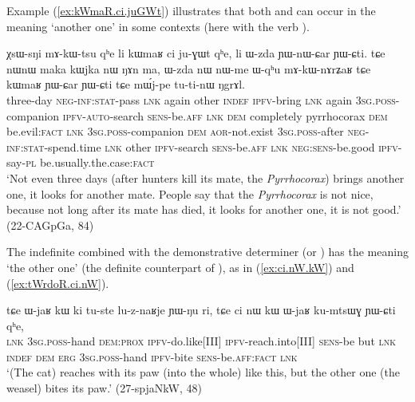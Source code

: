 Example (\ref{ex:kWmaR.ci.juGWt}) illustrates that both  and  can occur in the meaning `another one' in some contexts (here with the verb ).

 \begin{exe}
\ex \label{ex:kWmaR.ci.juGWt}
\gll  χsɯ-sŋi mɤ-kɯ-tsu qʰe li kɯmaʁ ci ju-ɣɯt qʰe, li ɯ-zda ɲɯ-nɯ-ɕar ɲɯ-ɕti.
tɕe nɯnɯ maka kɯjka nɯ ŋɤn ma, ɯ-zda nɯ nɯ-me ɯ-qʰu mɤ-kɯ-nɤrʑaʁ tɕe kɯmaʁ ɲɯ-ɕar ɲɯ-ɕti tɕe mɯ́j-pe tu-ti-nɯ ŋgrɤl. \\
three-day \textsc{neg}-\textsc{inf}:\textsc{stat}-pass \textsc{lnk} again other \textsc{indef} \textsc{ipfv}-bring \textsc{lnk} again \textsc{3sg}.\textsc{poss}-companion \textsc{ipfv}-\textsc{auto}-search \textsc{sens}-be.\textsc{aff} \textsc{lnk} \textsc{dem} completely pyrrhocorax \textsc{dem} be.evil:\textsc{fact} \textsc{lnk} \textsc{3sg}.\textsc{poss}-companion \textsc{dem}  \textsc{aor}-not.exist \textsc{3sg}.\textsc{poss}-after \textsc{neg}-\textsc{inf}:\textsc{stat}-spend.time \textsc{lnk} other \textsc{ipfv}-search \textsc{sens}-be.\textsc{aff} \textsc{lnk} \textsc{neg}:\textsc{sens}-be.good \textsc{ipfv}-say-\textsc{pl} be.usually.the.case:\textsc{fact} \\
\glt `Not even three days (after hunters kill its mate, the \textit{Pyrrhocorax}) brings another one, it looks for another mate. People say that the \textit{Pyrrhocorax} is not nice, because not long after its mate has died, it looks for another one, it is not good.' (22-CAGpGa, 84)
\end{exe}

The indefinite  combined with the demonstrative determiner  (or ) has the meaning `the other one' (the definite counterpart of ), as in (\ref{ex:ci.nW.kW}) and (\ref{ex:tWrdoR.ci.nW}).

\begin{exe}
\ex \label{ex:ci.nW.kW}
 \gll tɕe ɯ-jaʁ kɯ ki tu-ste lu-z-naʁje ɲɯ-ŋu ri, tɕe ci nɯ kɯ ɯ-jaʁ ku-mtsɯɣ ɲɯ-ɕti qʰe, \\
 \textsc{lnk} \textsc{3sg}.\textsc{poss}-hand \textsc{dem}:\textsc{prox} \textsc{ipfv}-do.like[III]  \textsc{ipfv}-reach.into[III] \textsc{sens}-be but \textsc{lnk} \textsc{indef} \textsc{dem} \textsc{erg} \textsc{3sg}.\textsc{poss}-hand  \textsc{ipfv}-bite \textsc{sens}-be.\textsc{aff}:\textsc{fact} \textsc{lnk} \\
\glt `(The cat) reaches with its paw (into the whole) like this, but the other one (the weasel) bites its paw.' (27-spjaNkW, 48)
\end{exe}

